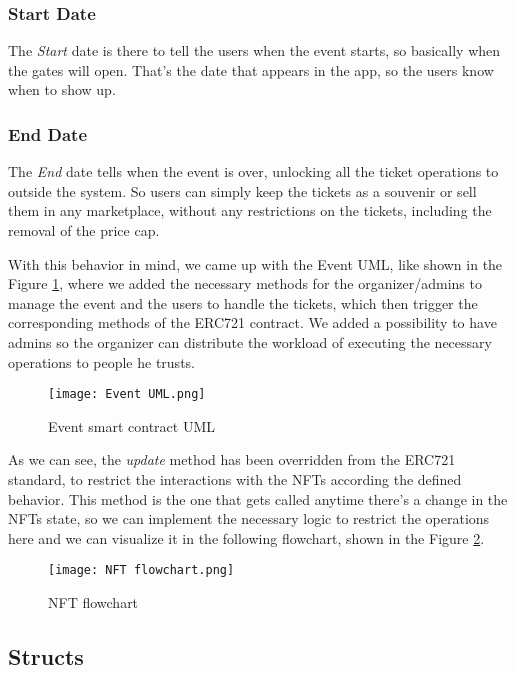 \subsubsection{Start Date}

The \textit{Start} date is there to tell the users when the event starts, so basically when the gates will open. That's the date that appears in the app, so the users know when to show up.

\subsubsection{End Date}

The \textit{End} date tells when the event is over, unlocking all the ticket operations to outside the system. So users can simply keep the tickets as a souvenir or sell them in any marketplace, without any restrictions on the tickets, including the removal of the price cap.

With this behavior in mind, we came up with the Event UML, like shown in the Figure \ref{fig:event_uml}, where we added the necessary methods for the organizer/admins to manage the event and the users to handle the tickets, which then trigger the corresponding methods of the ERC721 contract. We added a possibility to have admins so the organizer can distribute the workload of executing the necessary operations to people he trusts.

\begin{figure}[H]
    \texttt{[image: Event UML.png]}
    \centering
    \caption{Event smart contract UML}
    \label{fig:event_uml}
\end{figure}

As we can see, the \textit{update} method has been overridden from the ERC721 standard, to restrict the interactions with the NFTs according the defined behavior. This method is the one that gets called anytime there's a change in the NFTs state, so we can implement the necessary logic to restrict the operations here and we can visualize it in the following flowchart, shown in the Figure \ref{fig:nft_flowchart}.

\begin{figure}[H]
    \texttt{[image: NFT flowchart.png]}
    \centering
    \caption{NFT flowchart}
    \label{fig:nft_flowchart}
\end{figure}

\subsection{Structs}
\label{subsec:structs}

